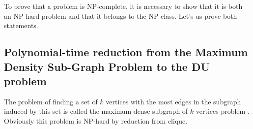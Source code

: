 \documentclass[smallextended]{svjour3}       %
\begin{document}
To prove that a problem is NP-complete, it is necessary to show that it is both an NP-hard problem and that it belongs to the NP class. Let's us prove both statements.

\subsection{Polynomial-time reduction from the Maximum Density Sub-Graph Problem to the DU problem}

The problem of finding a set of $k$ vertices with the most edges in the subgraph induced by this set is called the maximum dense subgraph of $k$ vertices problem \cite{kortsarz1993choosing}.  Obviously this problem is NP-hard by reduction from clique. 

\end{document}
